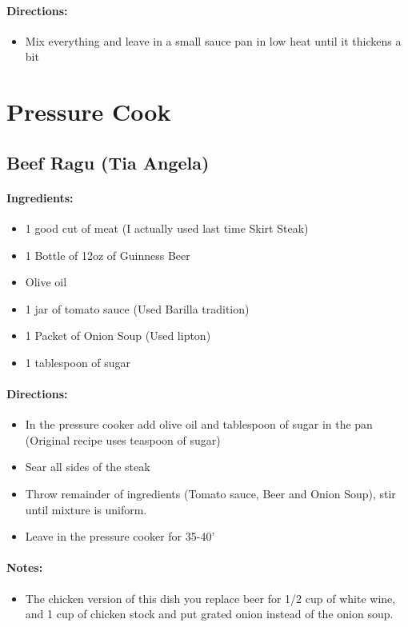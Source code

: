 \documentclass{article}
\begin{document}
\paragraph{Directions:}
\begin{itemize}
    \item Mix everything and leave in a small sauce pan in low heat until it thickens a bit
\end{itemize}

\section{Pressure Cook}


\subsection{Beef Ragu (Tia Angela)}

\paragraph{Ingredients:}
\begin{itemize}
    \item 1 good cut of meat (I actually used last time Skirt Steak)
    \item 1 Bottle of 12oz of Guinness Beer
    \item Olive oil
    \item 1 jar of tomato sauce (Used Barilla tradition)
    \item 1 Packet of Onion Soup (Used lipton)
    \item 1 tablespoon of sugar
\end{itemize}

\paragraph{Directions:}
\begin{itemize}
    \item In the pressure cooker add olive oil and tablespoon of sugar in the pan (Original recipe uses teaspoon of sugar)
    \item Sear all sides of the steak
    \item Throw remainder of ingredients (Tomato sauce, Beer and Onion Soup), stir until mixture is uniform.
    \item Leave in the pressure cooker for 35-40'
\end{itemize}

\paragraph{Notes:}
\begin{itemize}
    \item The chicken version of this dish you replace beer for 1/2 cup of white wine, and 1 cup of chicken stock and put grated onion instead of the onion soup.
\end{itemize}
\end{document}
